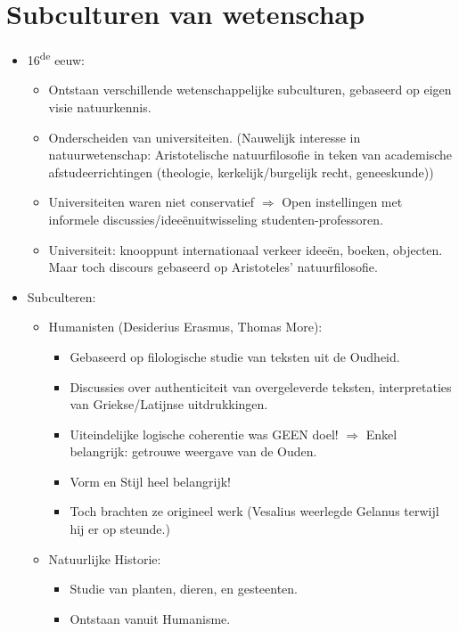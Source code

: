 \documentclass{article}
\begin{document}
  \section{Subculturen van wetenschap}
    \begin{itemize}
      \item 16\textsuperscript{de} eeuw:
      \begin{itemize}
        \item Ontstaan verschillende wetenschappelijke subculturen, gebaseerd op eigen visie natuurkennis.
        \item Onderscheiden van universiteiten. (Nauwelijk interesse in natuurwetenschap: Aristotelische natuurfilosofie in teken van academische afstudeerrichtingen (theologie, kerkelijk/burgelijk recht, geneeskunde))
        \item Universiteiten waren niet conservatief $\Rightarrow$ Open instellingen met informele discussies/idee\"enuitwisseling studenten-professoren.
        \item Universiteit: knooppunt internationaal verkeer idee\"en, boeken, objecten. Maar toch discours gebaseerd op Aristoteles' natuurfilosofie.
      \end{itemize}
      \item Subculteren:
      \begin{itemize}
        \item Humanisten (Desiderius Erasmus, Thomas More):
        \begin{itemize}
          \item Gebaseerd op filologische studie van teksten uit de Oudheid.
          \item Discussies over authenticiteit van overgeleverde teksten, interpretaties van Griekse/Latijnse uitdrukkingen.
          \item Uiteindelijke logische coherentie was GEEN doel! $\Rightarrow$ Enkel belangrijk: getrouwe weergave van de Ouden.
          \item Vorm en Stijl heel belangrijk!
          \item Toch brachten ze origineel werk (Vesalius weerlegde Gelanus terwijl hij er op steunde.)
        \end{itemize}
        \item Natuurlijke Historie:
        \begin{itemize}
          \item Studie van planten, dieren, en gesteenten.
          \item Ontstaan vanuit Humanisme.

\end{itemize}
\end{itemize}
\end{itemize}
\end{document}

